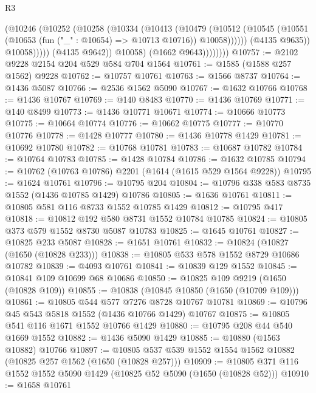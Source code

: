 \begin{lexlean}{R3}
\begin{coremodule}
                            (@10246
                              (@10252
                                (@10258
                                  (@10334
                                    (@10413
                                      (@10479
                                        (@10512
                                          (@10545
                                            (@10551
                                              (@10653 (fun ("_" : @10654) => @10713 @10716))
                                              @10058))))))
                                  (@4135 @9635))
                                @10058)))))
                      (@4135 @9642))
                    @10058)
                  (@1662 @9643))))))))
@10757 := @2102 @9228 @2154 @204 @529 @584 @704 @1564
@10761 := @1585 (@1588 @257 @1562) @9228
@10762 := @10757 @10761
@10763 := @1566 @8737
@10764 := @1436 @5087
@10766 := @2536 @1562 @5090
@10767 := @1632 @10766
@10768 := @1436 @10767
@10769 := @140 @8483
@10770 := @1436 @10769
@10771 := @140 @8499
@10773 := @1436 @10771 @10671
@10774 := @10666 @10773
@10775 := @10664 @10774
@10776 := @10662 @10775
@10777 := @10770 @10776
@10778 := @1428 @10777
@10780 := @1436 @10778 @1429
@10781 := @10692 @10780
@10782 := @10768 @10781
@10783 := @10687 @10782
@10784 := @10764 @10783
@10785 := @1428 @10784
@10786 := @1632 @10785
@10794 := @10762 (@10763 @10786) @2201 (@1614 (@1615 @529 @1564 @9228))
@10795 := @1624 @10761
@10796 := @10795 @204
@10804 := @10796 @338 @583 @8735 @1552 (@1436 @10785 @1429) @10786
@10805 := @1636 @10761
@10811 := @10805 @581 @116 @8733 @1552 @10785 @1429
@10812 := @10795 @417
@10818 := @10812 @192 @580 @8731 @1552 @10784 @10785
@10824 := @10805 @373 @579 @1552 @8730 @5087 @10783
@10825 := @1645 @10761
@10827 := @10825 @233 @5087
@10828 := @1651 @10761
@10832 := @10824 (@10827 (@1650 (@10828 @233)))
@10838 := @10805 @533 @578 @1552 @8729 @10686 @10782
@10839 := @4093 @10761
@10841 := @10839 @129 @1552
@10845 := @10841 @109 @10699 @68 @10686
@10850 := @10825 @109 @9219 (@1650 (@10828 @109))
@10855 := @10838 (@10845 @10850 (@1650 (@10709 @109)))
@10861 := @10805 @544 @577 @7276 @8728 @10767 @10781
@10869 := @10796 @45 @543 @5818 @1552 (@1436 @10766 @1429) @10767
@10875 := @10805 @541 @116 @1671 @1552 @10766 @1429
@10880 := @10795 @208 @44 @540 @1669 @1552
@10882 := @1436 @5090 @1429
@10885 := @10880 (@1563 @10882) @10766
@10897 := @10805 @537 @539 @1552 @1554 @1562 @10882 (@10825 @257 @1562 (@1650 (@10828 @257)))
@10909 := @10805 @371 @116 @1552 @1552 @5090 @1429 (@10825 @52 @5090 (@1650 (@10828 @52)))
@10910 := @1658 @10761

\end{coremodule}
\end{lexlean}
